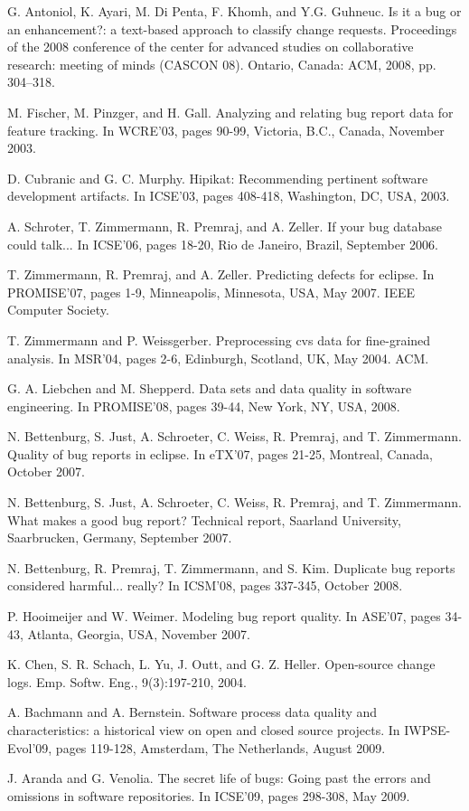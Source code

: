 \begin{thebibliography}{99.}
 G. Antoniol, K. Ayari, M. Di Penta, F. Khomh, and Y.G. Guhneuc. 
Is it a bug or an enhancement?: a text-based approach to classify change requests. 
Proceedings of the 2008 conference of the center for advanced studies on collaborative research: 
meeting of minds (CASCON 08). Ontario, Canada: ACM, 2008, pp. 304–318.

 M. Fischer, M. Pinzger, and H. Gall. Analyzing and relating bug report data for 
feature tracking. In WCRE'03, pages 90-99, Victoria, B.C., Canada, November 2003.

 D. Cubranic and G. C. Murphy. Hipikat: Recommending pertinent software development 
artifacts. In ICSE'03, pages 408-418, Washington, DC, USA, 2003.

  A. Schroter, T. Zimmermann, R. Premraj, and A. Zeller. If your bug database could 
talk... In ICSE'06, pages 18-20, Rio de Janeiro, Brazil, September 2006.

 T. Zimmermann, R. Premraj, and A. Zeller. Predicting defects for eclipse. In PROMISE'07, 
pages 1-9, Minneapolis, Minnesota, USA, May 2007. IEEE Computer Society.

 T. Zimmermann and P. Weissgerber. Preprocessing cvs data for fine-grained analysis. In 
MSR'04, pages 2-6, Edinburgh, Scotland, UK, May 2004. ACM.

  G. A. Liebchen and M. Shepperd. Data sets and data quality in software engineering. In 
PROMISE'08, pages 39-44, New York, NY, USA, 2008.

 N. Bettenburg, S. Just, A. Schroeter, C. Weiss, R. Premraj, and T. Zimmermann. Quality of 
bug reports in eclipse. In eTX'07, pages 21-25, Montreal, Canada, October 2007.

 N. Bettenburg, S. Just, A. Schroeter, C. Weiss, R. Premraj, and T. Zimmermann. 
What makes a good bug report? Technical report, Saarland University, Saarbrucken, Germany, September 2007.

 N. Bettenburg, R. Premraj, T. Zimmermann, and S. Kim. Duplicate bug reports considered 
harmful... really? In ICSM'08, pages 337-345, October 2008.

 P. Hooimeijer and W. Weimer. Modeling bug report quality. In ASE'07, pages 34-43, Atlanta, 
Georgia, USA, November 2007.

 K. Chen, S. R. Schach, L. Yu, J. Outt, and G. Z. Heller. Open-source change logs. Emp. 
Softw. Eng., 9(3):197-210, 2004.

 A. Bachmann and A. Bernstein. Software process data quality and characteristics: a 
historical view on open and closed source projects. In IWPSE-Evol'09, pages 119-128, Amsterdam, The 
Netherlands, August 2009.

 J. Aranda and G. Venolia. The secret life of bugs: Going past the errors and omissions 
in software repositories. In ICSE'09, pages 298-308, May 2009.

\end{thebibliography}
